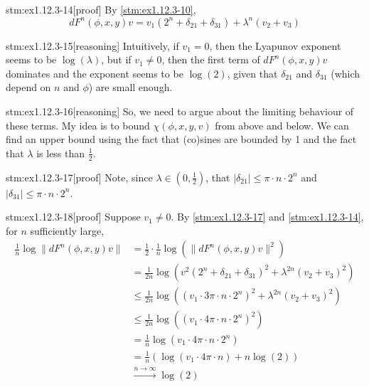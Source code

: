 \begin{stm}{stm:ex1.12.3-14}[proof]
By \ref{stm:ex1.12.3-10},
\[
dF^n(\phi, x, y)v = v_1 (2^n + \delta_{21} + \delta_{31}) + \lambda^n (v_2 + v_3)
\]
\end{stm}

\begin{stm}{stm:ex1.12.3-15}[reasoning]
Intuitively, if $v_1 = 0$, then the Lyapunov exponent seems to be $\log(\lambda)$, but if $v_1 \neq 0$, then the first term of $dF^n(\phi, x, y)v$ dominates and the exponent seems to be $\log(2)$, given that $\delta_{21}$ and $\delta_{31}$ (which depend on $n$ and $\phi$) are small enough.
\end{stm}

\begin{stm}{stm:ex1.12.3-16}[reasoning]
So, we need to argue about the limiting behaviour of these terms. My idea is to bound $\chi(\phi, x, y, v)$ from above and below. We can find an upper bound using the fact that (co)sines are bounded by 1 and the fact that $\lambda$ is less than $\frac{1}{2}$.
\end{stm}

\begin{stm}{stm:ex1.12.3-17}[proof]
Note, since $\lambda \in (0, \frac{1}{2})$, that $|\delta_{21}| \le \pi \cdot n \cdot 2^n$ and $|\delta_{31}| \le \pi \cdot n \cdot 2^n$.
\end{stm}

\begin{stm}{stm:ex1.12.3-18}[proof]
Suppose $v_1 \neq 0$. By \ref{stm:ex1.12.3-17} and \ref{stm:ex1.12.3-14}, for $n$ sufficiently large,
\begin{align*}
\frac{1}{n} \log \| dF^n(\phi, x, y)v \| 
&= \frac{1}{2} \cdot \frac{1}{n} \log \left( \| dF^n(\phi, x, y)v \|^2 \right) \\
&= \frac{1}{2n} \log \left( v^2 (2^n + \delta_{21} + \delta_{31})^2 + \lambda^{2n}(v_2 + v_3)^2 \right) \\
&\le \frac{1}{2n} \log \left( (v_1 \cdot 3 \pi \cdot n \cdot 2^n)^2 + \lambda^{2n}(v_2 + v_3)^2 \right) \\
&\le \frac{1}{2n} \log \left( (v_1 \cdot 4 \pi \cdot n \cdot 2^n)^2 \right) \\
&= \frac{1}{n} \log (v_1 \cdot 4 \pi \cdot n \cdot 2^n) \\
&= \frac{1}{n} \left( \log(v_1 \cdot 4 \pi \cdot n) + n \log(2) \right)\\
&\xrightarrow{n \to \infty} \log(2)
\end{align*}
\end{stm}

